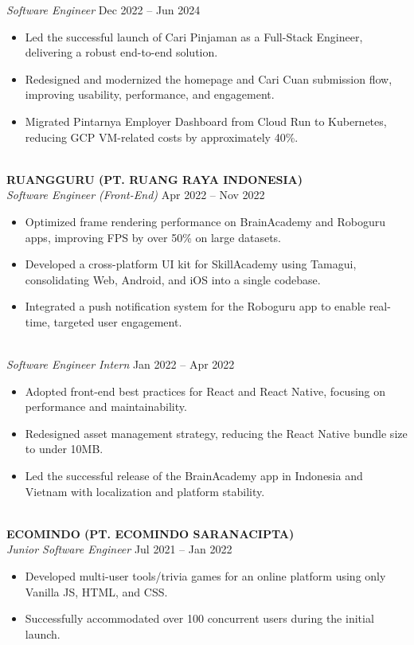 \documentclass[a4paper,10pt]{article}
\begin{document}
\textit{Software Engineer} \hfill Dec 2022 -- Jun 2024
\begin{itemize}
    \item Led the successful launch of Cari Pinjaman as a Full-Stack Engineer, delivering a robust end-to-end solution.
    \item Redesigned and modernized the homepage and Cari Cuan submission flow, improving usability, performance, and engagement.
    \item Migrated Pintarnya Employer Dashboard from Cloud Run to Kubernetes, reducing GCP VM-related costs by approximately 40\%.
\end{itemize}\\
\textbf{RUANGGURU (PT. RUANG RAYA INDONESIA)} \\
\textit{Software Engineer (Front-End)} \hfill Apr 2022 -- Nov 2022
\begin{itemize}
    \item Optimized frame rendering performance on BrainAcademy and Roboguru apps, improving FPS by over 50\% on large datasets.
    \item Developed a cross-platform UI kit for SkillAcademy using Tamagui, consolidating Web, Android, and iOS into a single codebase.
    \item Integrated a push notification system for the Roboguru app to enable real-time, targeted user engagement.
\end{itemize}\\
\textit{Software Engineer Intern} \hfill Jan 2022 -- Apr 2022
\begin{itemize}
    \item Adopted front-end best practices for React and React Native, focusing on performance and maintainability.
    \item Redesigned asset management strategy, reducing the React Native bundle size to under 10MB.
    \item Led the successful release of the BrainAcademy app in Indonesia and Vietnam with localization and platform stability.
\end{itemize}\\
\textbf{ECOMINDO (PT. ECOMINDO SARANACIPTA)} \\
\textit{Junior Software Engineer} \hfill Jul 2021 -- Jan 2022
\begin{itemize}
    \item Developed multi-user tools/trivia games for an online platform using only Vanilla JS, HTML, and CSS.
    \item Successfully accommodated over 100 concurrent users during the initial launch.
\end{itemize}
\end{document}
